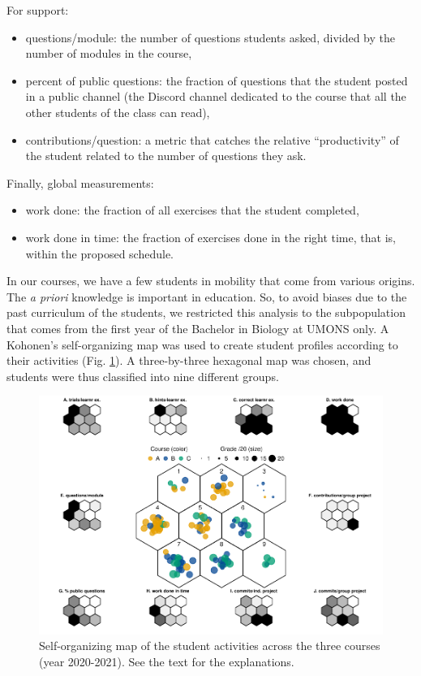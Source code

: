 \documentclass{aims} %
\theoremstyle{definition}
\begin{document}
For support:

\begin{itemize}
\item
  questions/module: the number of questions students asked, divided by
  the number of modules in the course,
\item
  percent of public questions: the fraction of questions that the
  student posted in a public channel (the Discord channel dedicated to
  the course that all the other students of the class can read),
\item
  contributions/question: a metric that catches the relative
  ``productivity'' of the student related to the number of questions
  they ask.
\end{itemize}

Finally, global measurements:

\begin{itemize}
\item
  work done: the fraction of all exercises that the student completed,
\item
  work done in time: the fraction of exercises done in the right time,
  that is, within the proposed schedule.
\end{itemize}

In our courses, we have a few students in mobility that come from
various origins. The \emph{a priori} knowledge is important in
education. So, to avoid biases due to the past curriculum of the
students, we restricted this analysis to the subpopulation that comes
from the first year of the Bachelor in Biology at UMONS only. A
Kohonen's self-organizing map was used to create student profiles
according to their activities (Fig. \ref {fig:fig_som}). A
three-by-three hexagonal map was chosen, and students were thus
classified into nine different groups.

\begin{figure}
\includegraphics[width=1\linewidth]{teaching_data_science_files/figure-latex/fig_som-1} \caption{\label{fig:fig_som} Self-organizing map of the student activities across the three courses (year 2020-2021). See the text for the explanations.}\label{fig:fig_som}
\end{figure}
\end{document}
